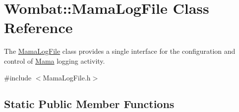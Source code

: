 \hypertarget{classWombat_1_1MamaLogFile}{
\section{Wombat::MamaLogFile Class Reference}
\label{classWombat_1_1MamaLogFile}
}


The {\ttfamily \hyperlink{classWombat_1_1MamaLogFile}{MamaLogFile}} class provides a single interface for the configuration and control of {\ttfamily \hyperlink{classWombat_1_1Mama}{Mama}} logging activity.  


{\ttfamily \#include $<$MamaLogFile.h$>$}\subsection*{Static Public Member Functions}
